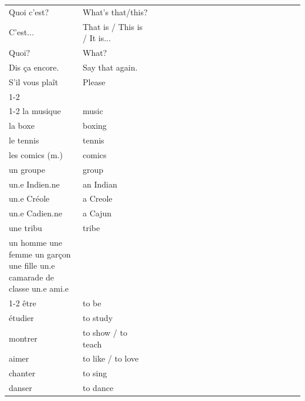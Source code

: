 \documentclass{article}
\begin{document}
\begin{tabular}{| p{0.25\linewidth} p{0.25\linewidth} | p{0.25\linewidth} p{0.25\linewidth} |}
    Quoi c'est?                           & What's that/this?              & &\\
    C'est...                              & That is / This is / It is...   & &\\
    Quoi?                                 & What?                          & &\\
    Dis ça encore.                        & Say that again.                & &\\
    S'il vous plaît                       & Please                         & &\\
    \cline{1-2}
    \multicolumn{2}{| l |}{Noms}                                           & &\\
    \cline{1-2}
    la musique                            & music                          & &\\
    la boxe                               & boxing                         & &\\
    le tennis                             & tennis                         & &\\
    les comics (m.)                       & comics                         & &\\
    un groupe                             & group                          & &\\
    un.e Indien.ne                        & an Indian                      & &\\
    un.e Créole                           & a Creole                       & &\\
    un.e Cadien.ne                        & a Cajun                        & &\\
    une tribu                             & tribe                          & &\\
    un homme
    une femme
    un garçon
    une fille
    un.e camarade de classe
    un.e ami.e
    \cline{1-2}
    \multicolumn{2}{| l |}{Verbes}                                         & &\\
    \cline{1-2}
    être                                  & to be                          & &\\
    étudier                               & to study                       & &\\
    montrer                               & to show / to teach             & &\\
    aimer                                 & to like / to love              & &\\
    chanter                               & to sing                        & &\\
    danser                                & to dance                       & &\\
    \hline
  \end{tabular}
\end{document}
